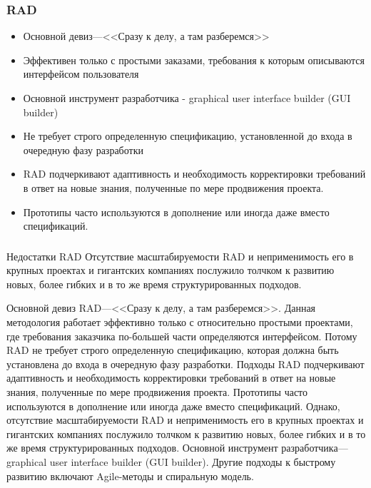 \documentclass{../industrial-development}
\begin{document}
\begin{frame} \frametitle{RAD}
  \begin{itemize}
  \item Основной девиз---<<Сразу к делу, а там разберемся>>
  \item Эффективен только с простыми заказами, требования к которым описываются интерфейсом пользователя 
	\item Основной инструмент разработчика - graphical user interface builder (GUI builder)
	\item Не требует строго определенную спецификацию, установленной до входа в очередную фазу разработки
	\item RAD подчеркивают адаптивность и необходимость корректировки требований в ответ на новые знания, полученные по мере продвижения проекта.
	\item Прототипы часто используются в дополнение или иногда даже вместо спецификаций.
  \end{itemize}

\end{frame}

\begin{frame} \frametitle{}
\begin {block}{Недостатки RAD}
Отсутствие \alert {масштабируемости} RAD и неприменимость его в крупных проектах и гигантских компаниях послужило толчком к развитию новых, более гибких и в то же время структурированных подходов.
\end {block}
\end{frame}	
	
\lecturenotes
Основной девиз RAD---<<Сразу к делу, а там разберемся>>. Данная методология работает эффективно только с относительно простыми проектами, где требования заказчика по-большей части определяются интерфейсом.
Потому RAD не требует строго определенную спецификацию, которая должна быть установлена до входа в очередную фазу разработки.
Подходы RAD подчеркивают адаптивность и необходимость корректировки требований в ответ на новые знания, полученные по мере продвижения  проекта. Прототипы часто используются в дополнение или иногда даже вместо спецификаций.
Однако, отсутствие \alert {масштабируемости} RAD и неприменимость его в крупных проектах и гигантских компаниях послужило толчком к развитию новых, более гибких и в то же время структурированных подходов.
Основной инструмент разработчика---graphical user interface builder (GUI builder).
Другие подходы к быстрому развитию включают Agile-методы и спиральную модель.~\cite{MethodolyComparison}
\end{document}
